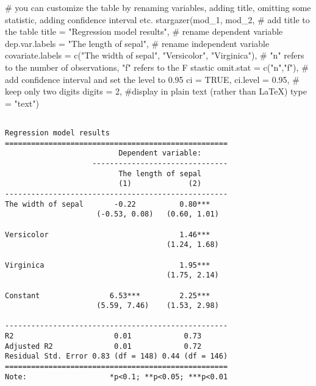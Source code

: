 \documentclass[
  letterpaper,
  DIV=11,
  numbers=noendperiod]{scrartcl}
\newenvironment{Shaded}{\begin{snugshade}}{\end{snugshade}}
\newcommand{\AttributeTok}[1]{\textcolor[rgb]{0.40,0.45,0.13}{#1}}
\newcommand{\CommentTok}[1]{\textcolor[rgb]{0.37,0.37,0.37}{#1}}
\newcommand{\ConstantTok}[1]{\textcolor[rgb]{0.56,0.35,0.01}{#1}}
\newcommand{\DecValTok}[1]{\textcolor[rgb]{0.68,0.00,0.00}{#1}}
\newcommand{\FloatTok}[1]{\textcolor[rgb]{0.68,0.00,0.00}{#1}}
\newcommand{\FunctionTok}[1]{\textcolor[rgb]{0.28,0.35,0.67}{#1}}
\newcommand{\NormalTok}[1]{\textcolor[rgb]{0.00,0.23,0.31}{#1}}
\newcommand{\StringTok}[1]{\textcolor[rgb]{0.13,0.47,0.30}{#1}}
\begin{document}
\begin{Shaded}
\begin{Highlighting}[]
\CommentTok{\# you can customize the table by renaming variables, adding title, omitting some statistic, adding confidence interval etc.}
\FunctionTok{stargazer}\NormalTok{(mod\_1, mod\_2,}
           \CommentTok{\# add title to the table}
           \AttributeTok{title =} \StringTok{"Regression model results"}\NormalTok{,}
           \CommentTok{\# rename dependent variable}
           \AttributeTok{dep.var.labels =} \StringTok{"The length of sepal"}\NormalTok{,}
           \CommentTok{\# rename independent variable}
           \AttributeTok{covariate.labels =} \FunctionTok{c}\NormalTok{(}\StringTok{"The width of sepal"}\NormalTok{, }\StringTok{"Versicolor"}\NormalTok{, }\StringTok{"Virginica"}\NormalTok{),}
           \CommentTok{\# "n" refers to the number of observations, "f" refers to the F stastic}
           \AttributeTok{omit.stat =} \FunctionTok{c}\NormalTok{(}\StringTok{"n"}\NormalTok{,}\StringTok{"f"}\NormalTok{),}
           \CommentTok{\# add confidence interval and set the level to 0.95}
           \AttributeTok{ci =} \ConstantTok{TRUE}\NormalTok{, }\AttributeTok{ci.level =} \FloatTok{0.95}\NormalTok{,}
           \CommentTok{\# keep only two digits}
           \AttributeTok{digits =} \DecValTok{2}\NormalTok{,}
           \CommentTok{\#display in plain text (rather than LaTeX)}
           \AttributeTok{type =} \StringTok{"text"}\NormalTok{)}
\end{Highlighting}
\end{Shaded}

\begin{verbatim}

Regression model results
===================================================
                          Dependent variable:      
                    -------------------------------
                          The length of sepal      
                          (1)             (2)      
---------------------------------------------------
The width of sepal       -0.22          0.80***    
                     (-0.53, 0.08)   (0.60, 1.01)  
                                                   
Versicolor                              1.46***    
                                     (1.24, 1.68)  
                                                   
Virginica                               1.95***    
                                     (1.75, 2.14)  
                                                   
Constant                6.53***         2.25***    
                     (5.59, 7.46)    (1.53, 2.98)  
                                                   
---------------------------------------------------
R2                       0.01            0.73      
Adjusted R2              0.01            0.72      
Residual Std. Error 0.83 (df = 148) 0.44 (df = 146)
===================================================
Note:                   *p<0.1; **p<0.05; ***p<0.01
\end{verbatim}
\end{document}
